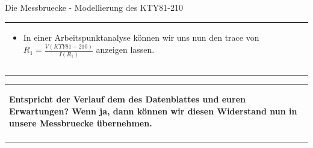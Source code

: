 \begin{frame}[t]{Die Messbruecke - Modellierung des KTY81-210}
\begin{spacing}{0.9}
\begin{tiny}
\begin{table}[h!]
\begin{tabular}{p{3cm} p{7cm}}
\begin{minipage}{.7\textwidth}
\begin{itemize}
                    \item In einer Arbeitspunktanalyse können wir uns nun den trace von $R_1=\frac{V(KTY81-210)}{I(R_1)}$ anzeigen lassen. 
                \end{itemize}
            \end{minipage} 
            \\\\\\
        \end{tabular}
        \begin{tabular}{p{10cm}}
            \begin{minipage}{\textwidth}
                \begin{center}   
                    \textbf{Entspricht der Verlauf dem des Datenblattes und euren Erwartungen? \newline
                            Wenn ja, dann können wir diesen Widerstand nun in unsere Messbruecke übernehmen.}
                \end{center}
            \end{minipage}
            \\ \\
        \end{tabular}
      \end{table}
    \end{tiny} \end{spacing}

\end{frame}